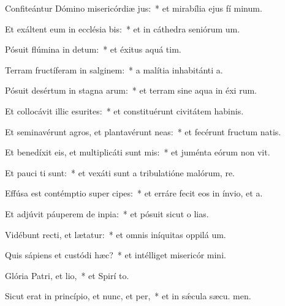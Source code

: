 \item Confiteántur Dómino misericórdiæ jus:~* et mirabília ejus fí minum.
\item Et exáltent eum in ecclésia bis:~* et in cáthedra seniórum  um.
\item Pósuit flúmina in detum:~* et éxitus aquá  tim.
\item Terram fructíferam in salginem:~* a malítia inhabitánti  a.
\item Pósuit desértum in stagna arum:~* et terram sine aqua in éxi rum.
\item Et collocávit illic esurites:~* et constituérunt civitátem habinis.
\item Et seminavérunt agros, et plantavérunt neas:~* et fecérunt fructum natis.
\item Et benedíxit eis, et multiplicáti sunt mis:~* et juménta eórum non vit.
\item Et pauci ti sunt:~* et vexáti sunt a tribulatióne malórum,  re.
\item Effúsa est contémptio super cipes:~* et erráre fecit eos in ínvio, et   a.
\item Et adjúvit páuperem de inpia:~* et pósuit sicut o lias.
\item Vidébunt recti, et lætatur:~* et omnis iníquitas oppilá  um.
\item Quis sápiens et custódi hæc?~* et intélliget misericór mini.
\item Glória Patri, et lio,~* et Spirí to.
\item Sicut erat in princípio, et nunc, et per,~* et in sǽcula sæcu. men.
